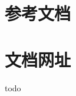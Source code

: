 \documentclass[UTF8]{article}
\begin{document}






    \newpage
    \begin{appendices}
    \section{参考文档}
    \section{文档网址}
    todo
    \end{appendices}
\end{document}
